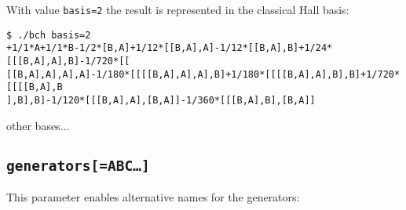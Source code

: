 \documentclass[11pt,a4paper]{article}
\begin{document}
\medskip

\noindent With value \verb|basis=2| the result is represented in the classical Hall basis:

\medskip

{\small\begin{BVerbatim}
$ ./bch basis=2
+1/1*A+1/1*B-1/2*[B,A]+1/12*[[B,A],A]-1/12*[[B,A],B]+1/24*[[[B,A],A],B]-1/720*[[
[[B,A],A],A],A]-1/180*[[[[B,A],A],A],B]+1/180*[[[[B,A],A],B],B]+1/720*[[[[B,A],B
],B],B]-1/120*[[[B,A],A],[B,A]]-1/360*[[[B,A],B],[B,A]]
\end{BVerbatim}
}

\medskip

\noindent [TODO:] other bases...

\subsection*{\tt generators[=\tt ABC\dots]}
This parameter enables alternative names for the generators:
\medskip


\medskip
\end{document}
